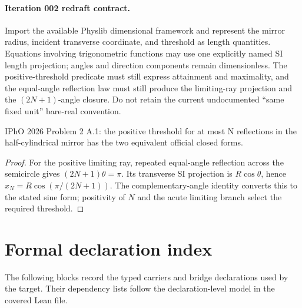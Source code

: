 \paragraph{Iteration 002 redraft contract.}
Import the available Physlib dimensional framework and represent the mirror
radius, incident transverse coordinate, and threshold as length quantities.
Equations involving trigonometric functions may use one explicitly named SI
length projection; angles and direction components remain dimensionless.  The
positive-threshold predicate must still express attainment and maximality, and
the equal-angle reflection law must still produce the limiting-ray projection
and the \((2N+1)\)-angle closure.  Do not retain the current undocumented
``same fixed unit'' bare-real convention.

\begin{theorem}
  \label{thm:physics:IPhO_2026_2_A_1:target}
  IPhO 2026 Problem 2 A.1: the positive threshold for at most N reflections in the half-cylindrical mirror has the two equivalent official closed forms.
\end{theorem}
\begin{proof}
  For the positive limiting ray, repeated equal-angle reflection across the
  semicircle gives \((2N+1)\theta=\pi\).  Its transverse SI projection is
  \(R\cos\theta\), hence \(x_N=R\cos(\pi/(2N+1))\).  The complementary-angle
  identity converts this to the stated sine form; positivity of \(N\) and the
  acute limiting branch select the required threshold.
\end{proof}
\section*{Formal declaration index}
The following blocks record the typed carriers and bridge declarations used by the target.  Their dependency lists follow the declaration-level model in the covered Lean file.

